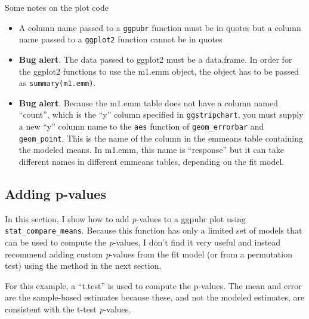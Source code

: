 \documentclass[]{book}
\providecommand{\tightlist}{%
  \setlength{\itemsep}{0pt}\setlength{\parskip}{0pt}}
\begin{document}
Some notes on the plot code

\begin{itemize}
\tightlist
\item
  A column name passed to a \texttt{ggpubr} function must be in quotes but a column name passed to a \texttt{ggplot2} function cannot be in quotes
\item
  \textbf{Bug alert}. The data passed to ggplot2 must be a data.frame. In order for the ggplot2 functions to use the m1.emm object, the object has to be passed as \texttt{summary(m1.emm)}.
\item
  \textbf{Bug alert}. Because the m1.emm table does not have a column named ``count'', which is the ``y'' column specified in \texttt{ggstripchart}, you must supply a new ``y'' column name to the \texttt{aes} function of \texttt{geom\_errorbar} and \texttt{geom\_point}. This is the name of the column in the emmeans table containing the modeled means. In m1.emm, this name is ``response'' but it can take different names in different emmeans tables, depending on the fit model.
\end{itemize}

\hypertarget{adding-p-values}{%
\subsection{Adding p-values}\label{adding-p-values}}

In this section, I show how to add \emph{p}-values to a ggpubr plot using \texttt{stat\_compare\_means}. Because this function has only a limited set of models that can be used to compute the \emph{p}-values, I don't find it very useful and instead recommend adding custom \emph{p}-values from the fit model (or from a permutation test) using the method in the next section.

For this example, a ``t.test'' is used to compute the p-values. The mean and error are the sample-based estimates because these, and not the modeled estimates, are consistent with the t-test \emph{p}-values.
\end{document}
